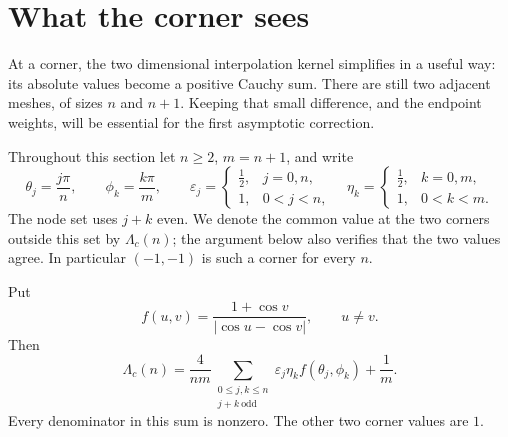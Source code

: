 \section{What the corner sees}\label{sec:corner}

At a corner, the two dimensional interpolation kernel simplifies in a
useful way: its absolute values become a positive Cauchy sum.  There are
still two adjacent meshes, of sizes $n$ and $n+1$.  Keeping that small
difference, and the endpoint weights, will be essential for the first
asymptotic correction.

Throughout this section let $n\geq2$, $m=n+1$, and write
\[
 \theta_j=\frac{j\pi}{n},\qquad \phi_k=\frac{k\pi}{m},\qquad
 \varepsilon_j=\begin{cases}\tfrac12,&j=0,n,\\1,&0<j<n,\end{cases}
 \quad
 \eta_k=\begin{cases}\tfrac12,&k=0,m,\\1,&0<k<m.\end{cases}
\]
The node set uses $j+k$ even.  We denote the common value at the two
corners outside this set by $\Lambda_c(n)$; the argument below also
verifies that the two values agree.  In particular $(-1,-1)$ is such a
corner for every $n$.

\begin{proposition}\label{prop:corner-formula}
Put
\[
 f(u,v)=\frac{1+\cos v}{|\cos u-\cos v|},\qquad u\ne v.
\]
Then
\begin{equation}\label{eq:corner-positive-sum}
 \Lambda_c(n)=\frac4{nm}
 \sum_{\substack{0\leq j,k\leq n\\j+k\ \mathrm{odd}}}
 \varepsilon_j\eta_k f(\theta_j,\phi_k)+\frac1m.
\end{equation}
Every denominator in this sum is nonzero.  The other two corner values
are $1$.
\end{proposition}

